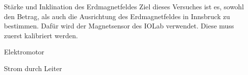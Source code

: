 \documentclass{alex_gp}
\begin{document}
\renewcommand{\labelenumi}{\alph{enumi})}


\begin{mybox}{Stärke und Inklination des Erdmagnetfeldes}
	Ziel dieses Versuches ist es, sowohl den Betrag, als auch die Ausrichtung des Erdmagnetfeldes in Innsbruck zu bestimmen. Dafür wird der Magnetsensor  des IOLab verwendet. Diese muss zuerst kalibriert werden. 
\end{mybox}

\begin{mybox}{Elektromotor}
	
\end{mybox}

\begin{mybox}{Strom durch Leiter}

\end{mybox}
\end{document}
